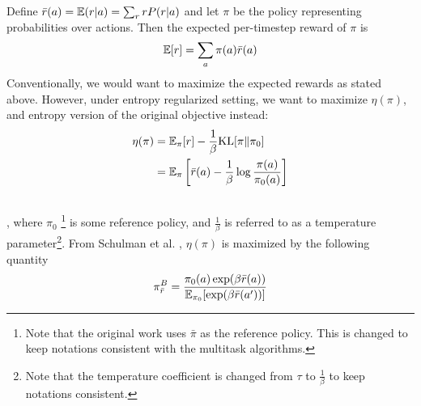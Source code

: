 \documentclass[12pt]{report}
\begin{document}
Define $\Bar{r}(a)=\mathbb{E}(r|a)=\sum_r rP(r|a)$ and let $\pi$ be the policy representing probabilities over actions. Then the expected per-timestep reward of $\pi$ is
$$\mathbb{E}[r]=\sum_a \pi(a)\Bar{r}(a)$$
Conventionally, we would want to maximize the expected rewards as stated above. However, under entropy regularized setting, we want to maximize $\eta(\pi)$, and entropy version of the original objective instead:
\begin{align}
    \eta(\pi)&=\mathbb{E}_\pi[r]-\frac{1}{\beta}\text{KL}[\pi\|\pi_0]\\
    &= \mathbb{E}_\pi\left[\Bar{r}(a) - \frac{1}{\beta}\log \frac{\pi(a)}{\pi_0(a)}\right]\\ 
    \nonumber
\end{align}
, where $\pi_0$ \footnote{Note that the original work \cite{schulman2017equivalence} uses $\bar{\pi}$ as the reference policy. This is changed to keep notations consistent with the multitask algorithms.} is some reference policy, and $\frac{1}{\beta}$ is referred to as a temperature parameter\footnote{Note that the temperature coefficient is changed from $\tau$ to $\frac{1}{\beta}$ to keep notations consistent.}. From Schulman et al. \cite{schulman2017equivalence}, $\eta(\pi)$ is maximized by the following quantity
\begin{align}
    \pi_{\Bar{r}}^B = \frac{\pi_0(a)\exp (\beta \Bar{r}(a))}{\mathbb{E}_{\pi_0}[\exp (\beta \Bar{r}(a^\prime))]} \label{eq2.3}
\end{align}




\end{document}
